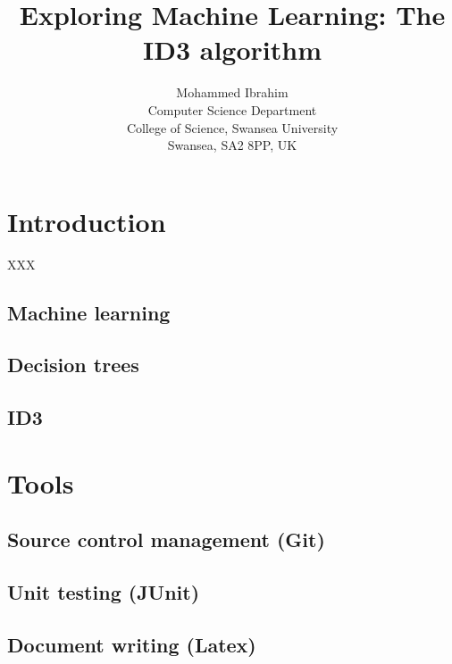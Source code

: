 \documentclass{article}
\begin{document}
\title{Exploring Machine Learning: The ID3 algorithm}

\author{Mohammed Ibrahim\\
 Computer Science Department\\
  College of Science, Swansea University\\
  Swansea, SA2 8PP, UK
}

\maketitle

\tableofcontents

\section{Introduction}
\label{sec:int}

XXX

\subsection{Machine learning}
\label{sec:machinelearn}


\subsection{Decision trees}
\label{sec:dectree}

\subsection{ID3}
\label{sec:ID3}



\section{Tools}
\label{sec:Tools}

\subsection{Source control management (Git)}
\label{sec:scm}

\subsection{Unit testing (JUnit)}
\label{sec:junit}

\subsection{Document writing (Latex)}
\label{sec:latex}
\end{document}
